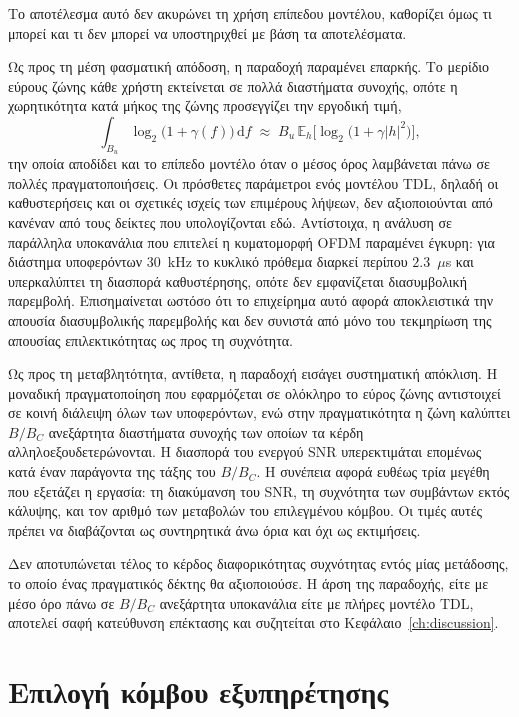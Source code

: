 Το αποτέλεσμα αυτό δεν ακυρώνει τη χρήση επίπεδου μοντέλου, καθορίζει όμως
τι μπορεί και τι δεν μπορεί να υποστηριχθεί με βάση τα αποτελέσματα.

Ως προς τη μέση φασματική απόδοση, η παραδοχή παραμένει επαρκής. Το
μερίδιο εύρους ζώνης κάθε χρήστη εκτείνεται σε πολλά διαστήματα συνοχής,
οπότε η χωρητικότητα κατά μήκος της ζώνης προσεγγίζει την εργοδική τιμή,
\begin{equation}
\int_{B_u} \log_2\!\big(1+\gamma(f)\big)\,\mathrm{d}f \;\approx\;
B_u \, \mathbb{E}_h\!\big[\log_2\!\big(1+\gamma|h|^{2}\big)\big],
\label{eq:ergodic-capacity}
\end{equation}
την οποία αποδίδει και το επίπεδο μοντέλο όταν ο μέσος όρος λαμβάνεται
πάνω σε πολλές πραγματοποιήσεις. Οι πρόσθετες παράμετροι ενός μοντέλου TDL,
δηλαδή οι καθυστερήσεις και οι σχετικές ισχείς των επιμέρους λήψεων, δεν
αξιοποιούνται από κανέναν από τους δείκτες που υπολογίζονται εδώ.
Αντίστοιχα, η ανάλυση σε παράλληλα υποκανάλια που επιτελεί η κυματομορφή
OFDM παραμένει έγκυρη: για διάστημα υποφερόντων $30$~kHz το κυκλικό
πρόθεμα διαρκεί περίπου $2.3$~$\mu$s και υπερκαλύπτει τη διασπορά
καθυστέρησης, οπότε δεν εμφανίζεται διασυμβολική παρεμβολή. Επισημαίνεται
ωστόσο ότι το επιχείρημα αυτό αφορά αποκλειστικά την απουσία
διασυμβολικής παρεμβολής και δεν συνιστά από μόνο του τεκμηρίωση της
απουσίας επιλεκτικότητας ως προς τη συχνότητα.

Ως προς τη μεταβλητότητα, αντίθετα, η παραδοχή εισάγει συστηματική
απόκλιση. Η μοναδική πραγματοποίηση που εφαρμόζεται σε ολόκληρο το εύρος
ζώνης αντιστοιχεί σε κοινή διάλειψη όλων των υποφερόντων, ενώ στην
πραγματικότητα η ζώνη καλύπτει $B/B_C$ ανεξάρτητα διαστήματα συνοχής των
οποίων τα κέρδη αλληλοεξουδετερώνονται. Η διασπορά του ενεργού SNR
υπερεκτιμάται επομένως κατά έναν παράγοντα της τάξης του $B/B_C$. Η
συνέπεια αφορά ευθέως τρία μεγέθη που εξετάζει η εργασία: τη διακύμανση
του SNR, τη συχνότητα των συμβάντων εκτός κάλυψης, και τον αριθμό των
μεταβολών του επιλεγμένου κόμβου. Οι τιμές αυτές πρέπει να διαβάζονται ως
συντηρητικά άνω όρια και όχι ως εκτιμήσεις.

Δεν αποτυπώνεται τέλος το κέρδος διαφορικότητας συχνότητας εντός μίας
μετάδοσης, το οποίο ένας πραγματικός δέκτης θα αξιοποιούσε. Η άρση της
παραδοχής, είτε με μέσο όρο πάνω σε $B/B_C$ ανεξάρτητα υποκανάλια είτε με
πλήρες μοντέλο TDL, αποτελεί σαφή κατεύθυνση επέκτασης και συζητείται στο
Κεφάλαιο~\ref{ch:discussion}.

\section{Επιλογή κόμβου εξυπηρέτησης}
\label{sec:meth-node-selection}

